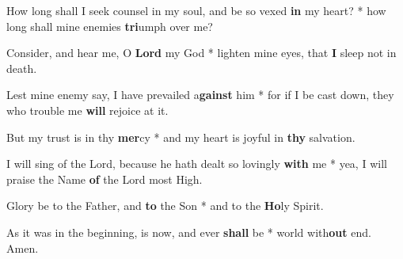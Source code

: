 \begin{multicols}{2}
	How long shall I seek counsel in my soul, and be so vexed \textbf{in} my heart? * how long shall mine enemies \textbf{tri}umph over me?
	
	Consider, and hear me, O \textbf{Lord} my God * lighten mine eyes, that \textbf{I} sleep not in death.
	
	Lest mine enemy say, I have prevailed a\textbf{gainst} him * for if I be cast down, they who trouble me \textbf{will} rejoice at it.
	
	But my trust is in thy \textbf{mer}cy * and my heart is joyful in \textbf{thy} salvation.
	
	I will sing of the Lord, because he hath dealt so lovingly \textbf{with} me * yea, I will praise the Name \textbf{of} the Lord most High.
	
	Glory be to the Father, and \textbf{to} the Son * and to the \textbf{Ho}ly Spirit.
	
	As it was in the beginning, is now, and ever \textbf{shall} be * world with\textbf{out} end. Amen.
\end{multicols}